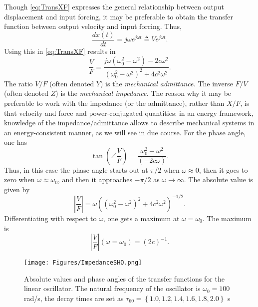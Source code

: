 Though \eqref{eq:TransXF} expresses the general relationship between output displacement and input forcing, it may be preferable to obtain the transfer function between output velocity and input forcing. Thus,
\begin{equation}
    \frac{dx(t)}{dt} = j\omega e^{j\omega t} \triangleq V e^{j\omega t}. 
\end{equation}
Using this in \eqref{eq:TransXF} results in
\begin{equation}
    \frac{V}{F} = \frac{j\omega(\omega_0^2 - \omega^2)-2c\omega^2}{(\omega_0^2-\omega^2)^2+4c^2\omega^2}.
\end{equation}
The ratio $V/F$ (often denoted $Y$) is the  \emph{mechanical admittance.} The inverse $F/V$ (often denoted $Z$) is the \emph{mechanical impedance.} The reason why it may be preferable to work with the impedance (or the admittance), rather than $X/F$, is that velocity and force and power-conjugated quantities: in an energy framework, knowledge of the impedance/admittance allows to describe mechanical systems in an energy-consistent manner, as we will see in due course. For the phase angle, one has
\begin{equation}
    \tan \left(\angle \frac{V}{F}\right) = \frac{\omega_0^2 - \omega^2}{(-2c\omega)}.
\end{equation}
Thus, in this case the phase angle starts out at $\pi/2$ when $\omega \approx 0$, then it goes to zero when $\omega \approx \omega_0$, and then it approaches $-\pi/2$ as $\omega \rightarrow \infty$. The absolute value is given by
\begin{equation}
    \left| \frac{V}{F} \right| = \omega \left((\omega_0^2-\omega^2)^2+4c^2\omega^2\right)^{-1/2}.
\end{equation}
Differentiating with respect to $\omega$, one gets a maximum at $\omega = \omega_0$. The maximum is 
\begin{equation}
    \left|\frac{V}{F}\right|(\omega = \omega_0) = (2c)^{-1}.
\end{equation}
\begin{figure}[hbt]
    \centering
    \texttt{[image: Figures/ImpedanceSHO.png]}
    \caption{Absolute values and phase angles of the transfer functions for the linear oscillator. The natural frequency of the oscillator is $\omega_0 = 100$ rad/s, the decay times are set as $\tau_{60}=\left\{1.0,1.2,1.4,1.6,1.8,2.0\right\}$ s}\label{fig:LinearTransFunctPlots}
\end{figure}



